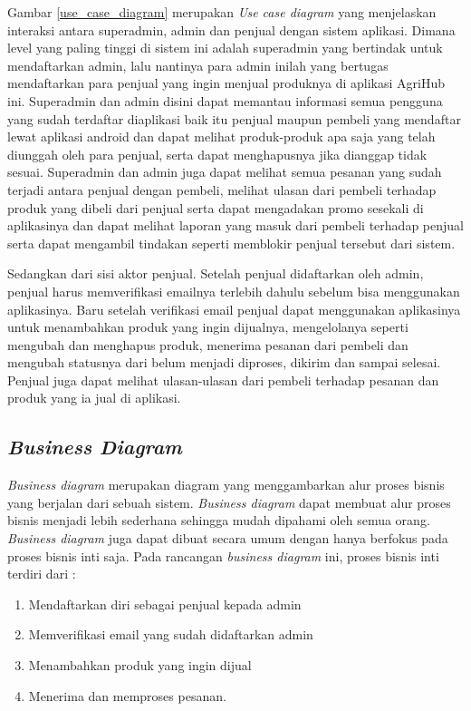 \par Gambar \ref*{use_case_diagram} merupakan\textit{ Use case diagram} yang menjelaskan interaksi antara superadmin, admin dan penjual dengan sistem aplikasi. Dimana level yang paling tinggi di sistem ini adalah superadmin yang bertindak untuk mendaftarkan admin, lalu nantinya para admin inilah yang bertugas mendaftarkan para penjual yang ingin menjual produknya di aplikasi AgriHub ini. Superadmin dan admin disini dapat memantau informasi semua pengguna yang sudah terdaftar diaplikasi baik itu penjual maupun pembeli yang mendaftar lewat aplikasi android dan dapat melihat produk-produk apa saja yang telah diunggah oleh para penjual, serta dapat menghapusnya jika dianggap tidak sesuai. Superadmin dan admin juga dapat melihat semua pesanan yang sudah terjadi antara penjual dengan pembeli, melihat ulasan dari pembeli terhadap produk yang dibeli dari penjual serta dapat mengadakan promo sesekali di aplikasinya dan dapat melihat laporan yang masuk dari pembeli terhadap penjual serta dapat mengambil tindakan seperti memblokir penjual tersebut dari sistem.

\par Sedangkan dari sisi aktor penjual. Setelah penjual didaftarkan oleh admin, penjual harus memverifikasi emailnya terlebih dahulu sebelum bisa menggunakan aplikasinya. Baru setelah verifikasi email penjual dapat menggunakan aplikasinya untuk menambahkan produk yang ingin dijualnya, mengelolanya seperti mengubah dan menghapus produk, menerima pesanan dari pembeli dan mengubah statusnya dari belum menjadi diproses, dikirim dan sampai selesai. Penjual juga dapat melihat ulasan-ulasan dari pembeli terhadap pesanan dan produk yang ia jual di aplikasi.

\subsection{\textit{Business Diagram}}
\textit{Business diagram} merupakan diagram yang menggambarkan alur proses bisnis yang berjalan dari sebuah sistem. \textit{Business diagram} dapat membuat alur proses bisnis menjadi lebih sederhana sehingga mudah dipahami oleh semua orang. \textit{Business diagram} juga dapat dibuat secara umum dengan hanya berfokus pada proses bisnis inti saja. Pada rancangan \textit{business diagram} ini, proses bisnis inti terdiri dari :

\begin{enumerate}
	\item Mendaftarkan diri sebagai penjual kepada admin
	\item Memverifikasi email yang sudah didaftarkan admin
	\item Menambahkan produk yang ingin dijual
	\item Menerima dan memproses pesanan.
\end{enumerate}

